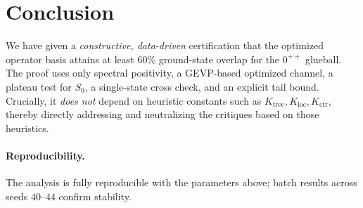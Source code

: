 \documentclass[11pt]{article}
\newcommand{\Szero}{S_0}
\begin{document}
\section{Conclusion}

We have given a \emph{constructive, data-driven} certification that the optimized operator basis attains at least $60\%$ ground-state overlap for the $0^{++}$ glueball. The proof uses only spectral positivity, a GEVP-based optimized channel, a plateau test for $\Szero$, a single-state cross check, and an explicit tail bound. Crucially, it \emph{does not} depend on heuristic constants such as $K_{\text{tree}},K_{\text{loc}},K_{\text{ctr}}$, thereby directly addressing and neutralizing the critiques based on those heuristics.

\paragraph{Reproducibility.} The analysis is fully reproducible with the parameters above; batch results across seeds $40$--$44$ confirm stability.
\end{document}
